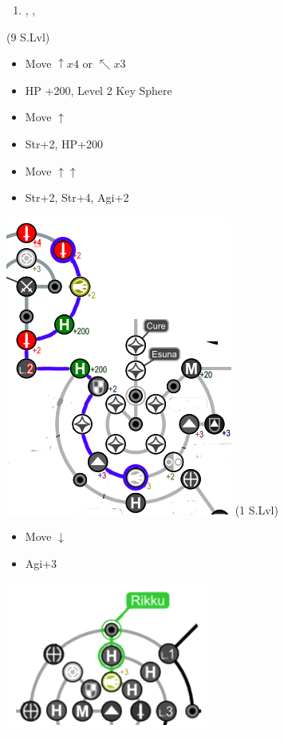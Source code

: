 \begin{enumerate}[resume]
	\item \cs[1:50], \sd, \sd
\end{enumerate}
\colend
\begin{spheregrid}
	\begin{multicols}{2}
		\begin{itemize}
			\yunaf (9 S.Lvl)
			\begin{itemize}
				\item Move $\uparrow x4$ or $\nwarrow x3$
				\item HP +200,   Level 2 Key Sphere
				\item Move $\uparrow$
				\item Str+2, HP+200
				\item Move $\uparrow\uparrow$
				\item Str+2, Str+4, Agi+2
			\end{itemize}
			\includegraphics[width=.6\columnwidth]{graphics/Yuna_post_spheremorph}
			\columnbreak
			\rikkuf (1 S.Lvl)
			\begin{itemize}
				\item Move $\downarrow$
				\item Agi+3
			\end{itemize}
			\includegraphics[width=.5\columnwidth]{graphics/macalaniarikku}

\end{itemize}
\end{multicols}
\end{spheregrid}
